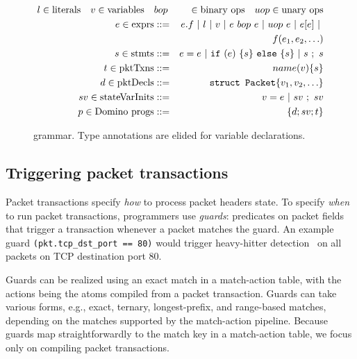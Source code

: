 \begin{figure}
\newcommand{\sep}{~|~}
\begin{scriptsize}
\begin{eqnarray*}
l \in \text{literals} \quad v \in \text{variables} \quad &bop& \in \text{binary ops} \quad
uop \in \text{unary ops} \\
%
e \in \text{exprs} &::=& e.f \sep l \sep v \sep e~bop~e \sep uop~e \sep e[e] \sep \\
                   & &   f(e_1, e_2, \ldots) \\
%
s \in \text{stmts} &::=& e = e \sep {\tt if}~(e)~\{ s \}~{\tt else}~ \{ s \} \sep s~;~s \\
%
t \in \text{pktTxns} &::=& name(v) \{ s \} \\
%
%
d \in \text{pktDecls} &::=& \text{\tt struct Packet} \{ v_1, v_2, \ldots \} \\
%
sv \in \text{stateVarInits} &::=& v = e \sep sv~;~sv \\
%
p \in \text{\pktlanguage progs} &::=& \{ d ; sv; t \}
\end{eqnarray*}
\end{scriptsize}
\caption{\pktlanguage grammar. Type annotations are elided for variable declarations.}
\label{fig:grammar}
\end{figure}


\subsection{Triggering packet transactions}
\label{ss:guards}
Packet transactions specify \textit{how} to process packet headers state.  To
specify {\em when} to run packet transactions, programmers use {\em guards}:
predicates on packet fields that trigger a transaction whenever a packet
matches the guard. An example guard {\tt (pkt.tcp\_dst\_port == 80)} would
trigger heavy-hitter detection~\cite{opensketch} on all packets on TCP
destination port 80.

Guards can be realized using an exact match in a match-action table, with the
actions being the atoms compiled from a packet transaction. Guards
can take various forms, e.g., exact, ternary, longest-prefix, and range-based
matches, depending on the matches supported by the match-action
pipeline. Because guards map straightforwardly to the match key in a
match-action table, we focus only on compiling packet transactions.


